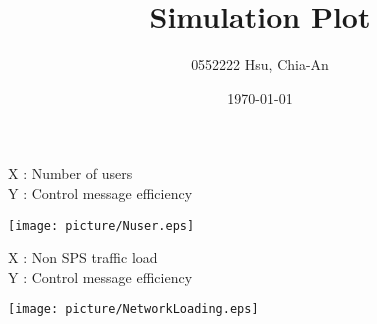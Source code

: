 \documentclass{article}
\title{{\LARGE Simulation Plot}}
\author{0552222 Hsu, Chia-An}
\date{\today}
\begin{document}
\maketitle

\noindent X : Number of users\\
Y : Control message efficiency\\

\begin{center}
\texttt{[image: picture/Nuser.eps]}
\end{center}

\newpage

\noindent X : Non SPS traffic load \\
Y : Control message efficiency\\

\begin{center}
\texttt{[image: picture/NetworkLoading.eps]}
\end{center}
\end{document}
